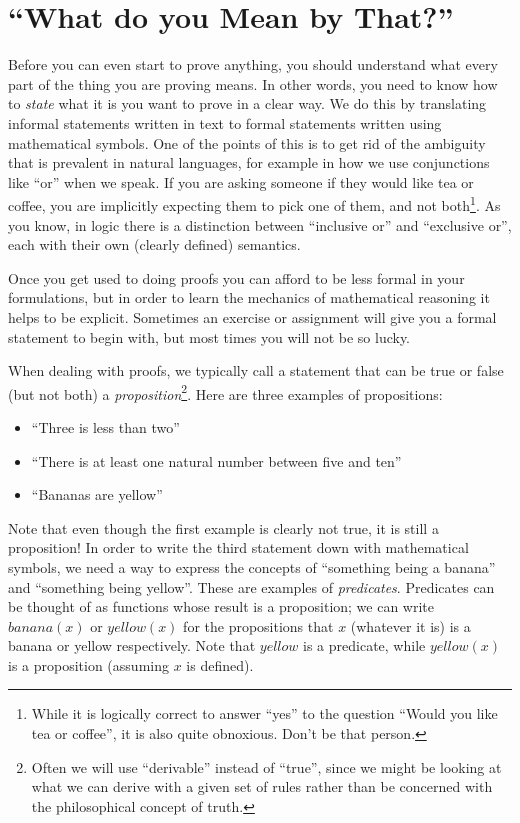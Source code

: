 \documentclass{tufte-handout}
\newcounter{example}
\newcounter{exc:first:proof}
\begin{document}
\section{``What do you Mean by That?''}

Before you can even start to prove anything, you should understand
what every part of the thing you are proving means. In other
words, you need to know how to \emph{state} what it is you want to
prove in a clear way. We do this by translating informal
statements written in text to formal statements written using
mathematical symbols.
%
One of the points of this is to get rid of the ambiguity that is
prevalent in natural languages, for example in how we use
conjunctions like ``or'' when we speak. If you are asking someone
if they would like tea or coffee, you are implicitly expecting
them to pick one of them, and not both\footnote{While it is
  logically correct to answer ``yes'' to the question ``Would you
  like tea or coffee'', it is also quite obnoxious. Don't be that
  person. }. As you know, in logic there is a distinction between
``inclusive or'' and ``exclusive or'', each with their own
(clearly defined) semantics.

Once you get used to doing proofs you can afford to be less formal
in your formulations, but in order to learn the mechanics of
mathematical reasoning it helps to be explicit.
%
Sometimes an exercise or assignment will give you a formal
statement to begin with, but most times you will not be so lucky.

When dealing with proofs, we typically call a statement that can
be true or false (but not both) a
\emph{proposition}\footnote{Often we will use ``derivable''
  instead of ``true'', since we might be looking at what we can
  derive with a given set of rules rather than be concerned with
  the philosophical concept of truth. }. Here are three examples
of propositions:
\begin{itemize}
\item ``Three is less than two''
\item ``There is at least one natural number between five
and ten''
\item ``Bananas are yellow''
\end{itemize}

\noindent
Note that even though the first example is clearly not true, it is
still a proposition!
%
In order to write the third statement down with mathematical
symbols, we need a way to express the concepts of ``something
being a banana'' and ``something being yellow''. These are
examples of \emph{predicates}. Predicates can be thought of as
functions whose result is a proposition; we can write
$\mathit{banana}(x)$ or $\mathit{yellow}(x)$ for the propositions
that $x$ (whatever it is) is a banana or yellow respectively. Note
that $\mathit{yellow}$ is a predicate, while $\mathit{yellow}(x)$
is a proposition (assuming $x$ is defined).
\end{document}
